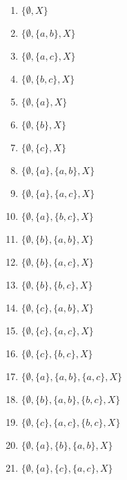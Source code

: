 \begin{multicols}{2}
\begin{enumerate}[1.]

\item $\{\emptyset, X\}$

\item $\{\emptyset, \{a,b\}, X\}$

\item $\{\emptyset, \{a,c\}, X\}$

\item $\{\emptyset, \{b,c\}, X\}$

\item $\{\emptyset, \{a\}, X\}$

\item $\{\emptyset, \{b\}, X\}$

\item $\{\emptyset, \{c\}, X\}$

\item $\{\emptyset, \{a\}, \{a,b\}, X\}$

\item $\{\emptyset, \{a\}, \{a,c\}, X\}$

\item $\{\emptyset, \{a\}, \{b,c\}, X\}$

\item $\{\emptyset, \{b\}, \{a,b\}, X\}$

\item $\{\emptyset, \{b\}, \{a,c\}, X\}$

\item $\{\emptyset, \{b\}, \{b,c\}, X\}$

\item $\{\emptyset, \{c\}, \{a,b\}, X\}$

\item $\{\emptyset, \{c\}, \{a,c\}, X\}$

\item $\{\emptyset, \{c\}, \{b,c\}, X\}$

\item $\{\emptyset, \{a\}, \{a,b\}, \{a,c\}, X\}$

\item $\{\emptyset, \{b\}, \{a,b\}, \{b,c\}, X\}$

\item $\{\emptyset, \{c\}, \{a,c\}, \{b,c\}, X\}$

\item $\{\emptyset, \{a\}, \{b\}, \{a,b\}, X\}$

\item $\{\emptyset, \{a\}, \{c\}, \{a,c\}, X\}$


\end{enumerate}
\end{multicols}
